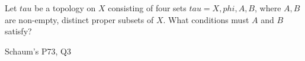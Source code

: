 \begin{samepage}
\begin{ex}
Let $tau$ be a topology on $X$ consisting of four sets $ tau = {{ X, phi, A, B }} $, where $A, B$ are non-empty, distinct proper subsets of $X$.
What conditions must $A$ and $B$ satisfy?
\end{ex}
\begin{source}
Schaum's P73, Q3
\end{source}
\end{samepage}
